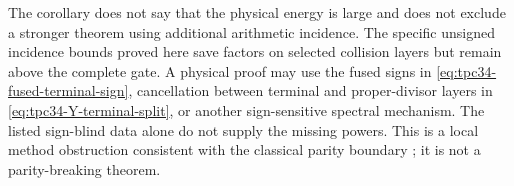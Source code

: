 The corollary does not say that the physical energy is large and does not
exclude a stronger theorem using additional arithmetic incidence.  The
specific unsigned incidence bounds proved here save factors on selected
collision layers but remain above the complete gate.  A physical proof
may use the fused signs in
\eqref{eq:tpc34-fused-terminal-sign}, cancellation between terminal and
proper-divisor layers in \eqref{eq:tpc34-Y-terminal-split}, or another
sign-sensitive spectral mechanism.  The listed sign-blind data alone do
not supply the missing powers.  This is a local
method obstruction consistent with the classical parity boundary
\citep{HeathBrown1982Parity}; it is not a parity-breaking theorem.
